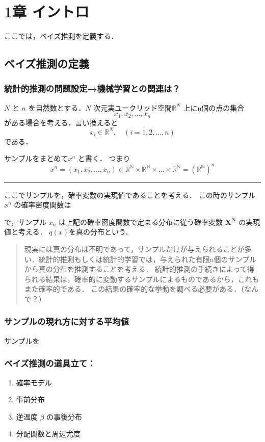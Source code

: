 \section{1章 イントロ}
ここでは，ベイズ推測を定義する．
\subsection{ベイズ推測の定義}
\subsubsection{統計的推測の問題設定→機械学習との関連は？}
\({N}\) と \({n}\) を自然数とする．\({N}\) 次元実ユークリッド空間\(\mathbb{R}^N\) 上にn個の点の集合
$$x_1,x_2,...,x_n$$がある場合を考える．言い換えると
$$x_i\in \mathbb{R}^N,\quad (i=1,2,...,n)$$ である．

サンプルをまとめて\({x^n}\) と書く．
つまり
$$x^n = (x_1,x_2,...,x_n) \in \mathbb{R^N} \times \mathbb{R^N} \times \dots \times \mathbb{R^N} = (\mathbb{R^N})^n$$

\noindent\rule{\textwidth}{0.5pt}
ここでサンプルを，確率変数の実現値であることを考える．
この時のサンプル \({x^n}\) の確率密度関数は


で，サンプル \({x_n}\) は上記の確率密度関数で定まる分布に従う確率変数 \({\mathbf{X^N}}\) の実現値と考える．
${q(x)}$を真の分布という．



\begin{quote}
現実には真の分布は不明であって，サンプルだけが与えられることが多い．統計的推測もしくは統計的学習では，与えられた有限n個のサンプルから真の分布を推測することを考える．
統計的推測の手続きによって得られる結果は，確率的に変動するサンプルによるものであるから，これもまた確率的である．
この結果の確率的な挙動を調べる必要がある．（なんで？）
\end{quote}
\subsubsection{サンプルの現れ方に対する平均値}
サンプルを
\subsubsection{ベイズ推測の道具立て：}
\begin{enumerate}
\item 確率モデル
\item 事前分布
\item 逆温度 \({\beta}\) の事後分布
\item 分配関数と周辺尤度
\end{enumerate}
